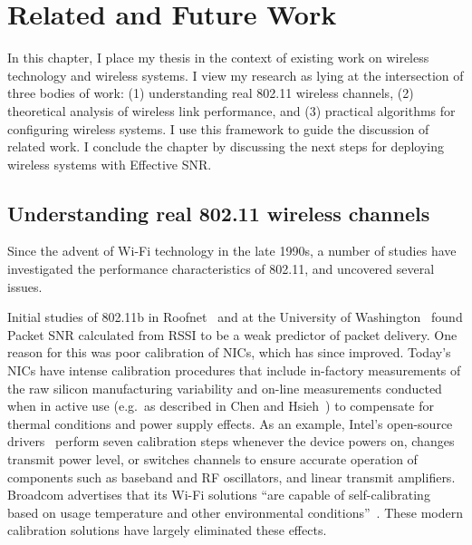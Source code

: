\ifx\mainfile\undefined

\setcounter{chapter}{8} %
\fi

\cleardoublepage
\chapter{Related and Future Work}
\label{chap:related}

In this chapter, I place my thesis in the context of existing work on wireless technology and wireless systems. I view my research as lying at the intersection of three bodies of work: (1) understanding real 802.11 wireless channels, (2) theoretical analysis of wireless link performance, and (3) practical algorithms for configuring wireless systems. I use this framework to guide the discussion of related work. I conclude the chapter by discussing the next steps for deploying wireless systems with Effective SNR.

\section{Understanding real 802.11 wireless channels}
Since the advent of Wi-Fi technology in the late 1990s, a number of studies have investigated the performance characteristics of 802.11, and uncovered several issues.

Initial studies of 802.11b in Roofnet~\cite{Aguayo_Roofnet} and at the University of Washington~\cite{Reis_interference} found Packet SNR calculated from RSSI to be a weak predictor of packet delivery. One reason for this was poor calibration of NICs, which has since improved. Today's NICs have intense calibration procedures that include in-factory measurements of the raw silicon manufacturing variability and on-line measurements conducted when in active use (e.g.\ as described in Chen and Hsieh~\cite{Chen_IQcalib}) to compensate for thermal conditions and power supply effects. As an example, Intel's open-source drivers~\cite{iwlwifi} perform seven calibration steps whenever the device powers on, changes transmit power level, or switches channels to ensure accurate operation of components such as baseband and RF oscillators, and linear transmit amplifiers. Broadcom advertises that its Wi-Fi solutions ``are capable of self-calibrating based on usage temperature and other environmental conditions''~\cite{Broadcom_calib}. These modern calibration solutions have largely eliminated these effects.

